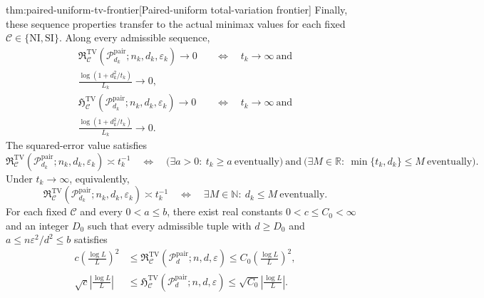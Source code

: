 \documentclass[11pt]{article}
\begin{document}
\begin{theoremv}{thm:paired-uniform-tv-frontier}[Paired-uniform total-variation frontier]
Finally, these sequence properties transfer to the actual minimax values for each fixed \(\mathcal C\in\{\mathrm{NI},\mathrm{SI}\}\). Along every admissible sequence,
\[
\begin{aligned}
 \mathfrak R^{\mathrm{TV}}_{\mathcal C}
   (\mathcal P_{d_k}^{\mathrm{pair}};n_k,d_k,\varepsilon_k)
   \longrightarrow0
 &\quad\Longleftrightarrow\quad
 t_k\longrightarrow\infty
 \ \text{and}\\
 \frac{\log(1+d_k^2/t_k)}{L_k}\longrightarrow0,\\
 \mathfrak H^{\mathrm{TV}}_{\mathcal C}
   (\mathcal P_{d_k}^{\mathrm{pair}};n_k,d_k,\varepsilon_k)
   \longrightarrow0
 &\quad\Longleftrightarrow\quad
 t_k\longrightarrow\infty
 \ \text{and}\\
 \frac{\log(1+d_k^2/t_k)}{L_k}\longrightarrow0.
\end{aligned}
\]
The squared-error value satisfies
\[
 \mathfrak R^{\mathrm{TV}}_{\mathcal C}
   (\mathcal P_{d_k}^{\mathrm{pair}};n_k,d_k,\varepsilon_k)
   \asymp t_k^{-1}
 \quad\Longleftrightarrow\quad
 \bigl(\exists a>0:\ t_k\ge a\ \text{eventually}\bigr)
 \ \text{and}\
 \bigl(\exists M\in\mathbb R:\ \min\{t_k,d_k\}\le M\
       \text{eventually}\bigr).
\]
Under \(t_k\to\infty\), equivalently,
\[
 \mathfrak R^{\mathrm{TV}}_{\mathcal C}
   (\mathcal P_{d_k}^{\mathrm{pair}};n_k,d_k,\varepsilon_k)
   \asymp t_k^{-1}
 \quad\Longleftrightarrow\quad
 \exists M\in\mathbb N:\ d_k\le M\ \text{eventually}.
\]
For each fixed \(\mathcal C\) and every \(0<a\le b\), there exist real constants \(0<c\le C_0<\infty\) and an integer \(D_0\) such that every admissible tuple with \(d\ge D_0\) and \(a\le n\varepsilon^2/d^2\le b\) satisfies
\[
\begin{aligned}
 c\left(\frac{\log L}{L}\right)^2
 &\le
 \mathfrak R^{\mathrm{TV}}_{\mathcal C}
   (\mathcal P_d^{\mathrm{pair}};n,d,\varepsilon)
 \le C_0\left(\frac{\log L}{L}\right)^2,\\
 \sqrt c\left|\frac{\log L}{L}\right|
 &\le
 \mathfrak H^{\mathrm{TV}}_{\mathcal C}
   (\mathcal P_d^{\mathrm{pair}};n,d,\varepsilon)
 \le \sqrt{C_0}\left|\frac{\log L}{L}\right|.
\end{aligned}
\]
\end{theoremv}
\end{document}
